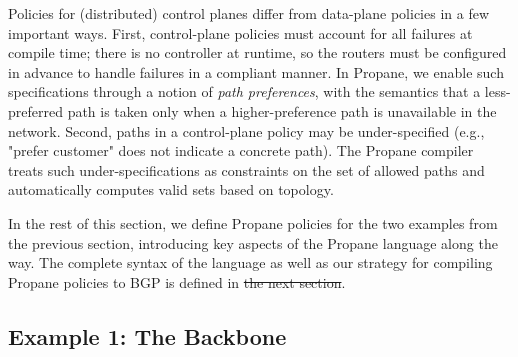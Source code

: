 \documentclass{sig-alternate-10pt}
\newcommand{\sysname}{{\small \sf Propane}\xspace}
\providecommand{\DIFadd}[1]{{\protect\color{blue}\uwave{#1}}} %
\providecommand{\DIFdel}[1]{{\protect\color{red}\sout{#1}}}                      %
\providecommand{\DIFaddbegin}{} %
\providecommand{\DIFaddend}{} %
\providecommand{\DIFdelbegin}{} %
\providecommand{\DIFdelend}{} %
\begin{document}
Policies for (distributed) control planes differ from data-plane
policies in a few important ways. First, control-plane
policies must account for all failures at compile time; there is
no controller at runtime, so the routers must be configured in advance to handle failures in a compliant manner.
%
In \sysname, we enable such specifications through a notion of {\em path preferences}, with the semantics that a less-preferred path is taken only when a higher-preference path is unavailable in the network.
%
Second, paths in a control-plane policy may be under-specified (e.g.,
"prefer customer" does not indicate a concrete path). The \sysname
compiler treats such under-specifications as constraints on the set of
allowed paths and automatically computes valid sets based on \DIFaddbegin \DIFadd{the }\DIFaddend topology.
%

In the rest of this section, we define \sysname policies for the two 
examples from the previous section, introducing key aspects of
the \sysname language along the way. The complete syntax of the
language as well as our strategy for compiling \sysname policies to
BGP is defined in \DIFdelbegin \DIFdel{the next section}\DIFdelend \DIFaddbegin \DIFadd{\S\ref{sec:compilation}}\DIFaddend .

\subsection{Example 1: The Backbone}

\end{document}

